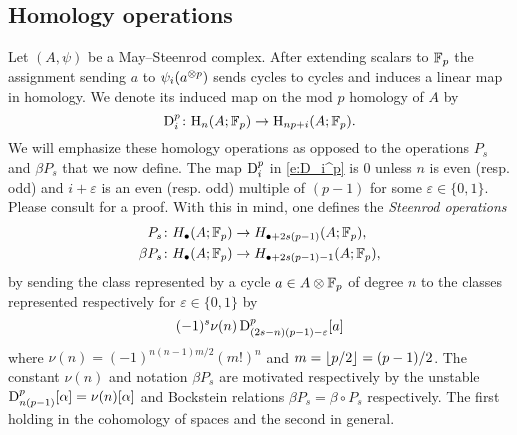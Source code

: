 \subsection{Homology operations}

Let $(A,\psi)$ be a May--Steenrod complex.
After extending scalars to ${\mathbb{F}_p}$ the assignment sending $a$ to $\psi_i(a^{\otimes p})$ sends cycles to cycles and induces a linear map in homology.
We denote its induced map on the mod $p$ homology of $A$ by
\begin{equation}\label{e:D_i^p}
	\mathrm{D}_i^p \colon \mathrm{H}_n(A; {\mathbb{F}_p}) \to \mathrm{H}_{np+i}(A; {\mathbb{F}_p}).
\end{equation}
We will emphasize these homology operations as opposed to the operations $P_s$ and $\beta P_s$ that we now define.
The map $\mathrm{D}_i^p$ in \eqref{e:D_i^p} is $0$ unless $n$ is even (resp. odd) and $i+\varepsilon$ is an even (resp. odd) multiple of $(p-1)$ for some $\varepsilon \in \{0,1\}$.
Please consult \cite[Proposition 2.3. (iv)]{may1970general} for a proof.
With this in mind, one defines the \textit{Steenrod operations}
\begin{align*}
	P_s \colon& H_\bullet(A; {\mathbb{F}_p}) \to H_{\bullet + 2s(p-1)}(A; {\mathbb{F}_p}), \\
	\beta P_s \colon& H_\bullet(A; {\mathbb{F}_p}) \to H_{\bullet + 2s(p-1) - 1}(A; {\mathbb{F}_p}),
\end{align*}
by sending the class represented by a cycle $a \in A \otimes {\mathbb{F}_p}$ of degree $n$ to the classes represented respectively for $\varepsilon \in \{0,1\}$ by
\begin{equation*}
	(-1)^s \nu(n) \, \mathrm{D}^p_{(2s-n)(p-1)-\varepsilon}[a]
\end{equation*}
where $\nu(n) = (-1)^{n(n-1)m/2}(m!)^n$ and $m = \lfloor p/2\rfloor = (p-1)/2$.
The constant $\nu(n)$ and notation $\beta P_s$ are motivated respectively by the unstable $\mathrm{D}_{n(p-1)}^p[\alpha] = \nu(n)[\alpha]$ and Bockstein relations $\beta P_s = \beta \circ P_s$ respectively.
The first holding in the cohomology of spaces and the second in general.